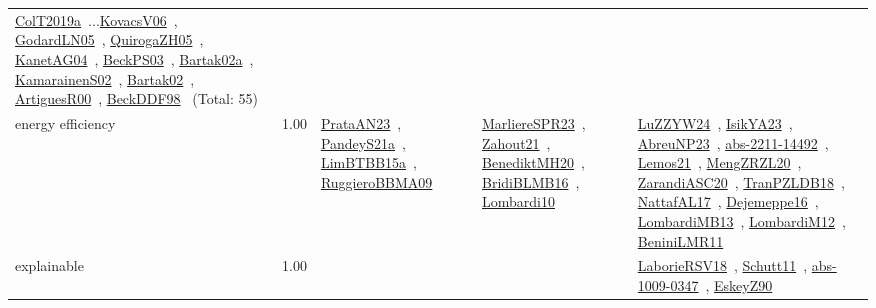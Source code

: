 {\begin{longtable}{p{3cm}r>{\raggedright\arraybackslash}p{6cm}>{\raggedright\arraybackslash}p{6cm}>{\raggedright\arraybackslash}p{8cm}}
\href{../works/ColT2019a.pdf}{ColT2019a}~\cite{ColT2019a}...\href{../works/KovacsV06.pdf}{KovacsV06}~\cite{KovacsV06}, \href{../works/GodardLN05.pdf}{GodardLN05}~\cite{GodardLN05}, \href{../works/QuirogaZH05.pdf}{QuirogaZH05}~\cite{QuirogaZH05}, \href{../works/KanetAG04.pdf}{KanetAG04}~\cite{KanetAG04}, \href{../works/BeckPS03.pdf}{BeckPS03}~\cite{BeckPS03}, \href{../works/Bartak02a.pdf}{Bartak02a}~\cite{Bartak02a}, \href{../works/KamarainenS02.pdf}{KamarainenS02}~\cite{KamarainenS02}, \href{../works/Bartak02.pdf}{Bartak02}~\cite{Bartak02}, \href{../works/ArtiguesR00.pdf}{ArtiguesR00}~\cite{ArtiguesR00}, \href{../works/BeckDDF98.pdf}{BeckDDF98}~\cite{BeckDDF98} (Total: 55)\\
\index{energy efficiency}\index{Concepts!energy efficiency}energy efficiency &  1.00 & \href{../works/PrataAN23.pdf}{PrataAN23}~\cite{PrataAN23}, \href{../works/PandeyS21a.pdf}{PandeyS21a}~\cite{PandeyS21a}, \href{../works/LimBTBB15a.pdf}{LimBTBB15a}~\cite{LimBTBB15a}, \href{../works/RuggieroBBMA09.pdf}{RuggieroBBMA09}~\cite{RuggieroBBMA09} & \href{../works/MarliereSPR23.pdf}{MarliereSPR23}~\cite{MarliereSPR23}, \href{../works/Zahout21.pdf}{Zahout21}~\cite{Zahout21}, \href{../works/BenediktMH20.pdf}{BenediktMH20}~\cite{BenediktMH20}, \href{../works/BridiBLMB16.pdf}{BridiBLMB16}~\cite{BridiBLMB16}, \href{../works/Lombardi10.pdf}{Lombardi10}~\cite{Lombardi10} & \href{../works/LuZZYW24.pdf}{LuZZYW24}~\cite{LuZZYW24}, \href{../works/IsikYA23.pdf}{IsikYA23}~\cite{IsikYA23}, \href{../works/AbreuNP23.pdf}{AbreuNP23}~\cite{AbreuNP23}, \href{../works/abs-2211-14492.pdf}{abs-2211-14492}~\cite{abs-2211-14492}, \href{../works/Lemos21.pdf}{Lemos21}~\cite{Lemos21}, \href{../works/MengZRZL20.pdf}{MengZRZL20}~\cite{MengZRZL20}, \href{../works/ZarandiASC20.pdf}{ZarandiASC20}~\cite{ZarandiASC20}, \href{../works/TranPZLDB18.pdf}{TranPZLDB18}~\cite{TranPZLDB18}, \href{../works/NattafAL17.pdf}{NattafAL17}~\cite{NattafAL17}, \href{../works/Dejemeppe16.pdf}{Dejemeppe16}~\cite{Dejemeppe16}, \href{../works/LombardiMB13.pdf}{LombardiMB13}~\cite{LombardiMB13}, \href{../works/LombardiM12.pdf}{LombardiM12}~\cite{LombardiM12}, \href{../works/BeniniLMR11.pdf}{BeniniLMR11}~\cite{BeniniLMR11}\\
\index{explainable}\index{Concepts!explainable}explainable &  1.00 &  &  & \href{../works/LaborieRSV18.pdf}{LaborieRSV18}~\cite{LaborieRSV18}, \href{../works/Schutt11.pdf}{Schutt11}~\cite{Schutt11}, \href{../works/abs-1009-0347.pdf}{abs-1009-0347}~\cite{abs-1009-0347}, \href{../works/EskeyZ90.pdf}{EskeyZ90}~\cite{EskeyZ90}\\

\end{longtable}}
